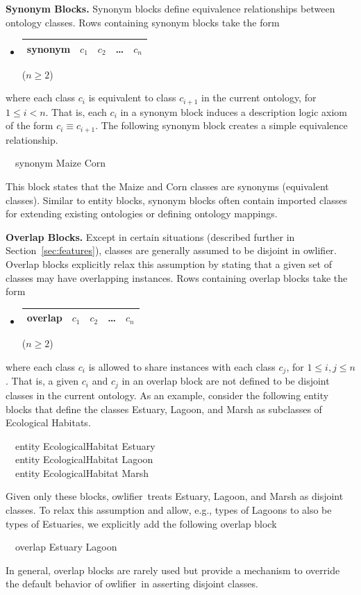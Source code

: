 \documentclass[preprint,number]{elsarticle}
\newcommand{\owlifier}{\textsf{owlifier}}
\newcommand{\myblock}[1]{\vspace{12pt}\noindent\textbf{#1}}
\newcommand{\secref}[1]{Section~\ref{#1}}
\begin{document}
\myblock{Synonym Blocks.} Synonym blocks define equivalence
relationships between ontology classes.  Rows containing synonym
blocks take the form
\begin{itemize}
\item[] 
  \begin{tabular}{|l|l|l|l|l|}\hline
    \textsf{synonym} & $c_1$ & $c_2$ & \dots & $c_n$ \\ \hline 
  \end{tabular} \hfill ($n \ge 2$)
\end{itemize}
where each class $c_i$ is equivalent to class $c_{i+1}$ in the current
ontology, for $1 \le i < n$. That is, each $c_i$ in a synonym block
induces a description logic axiom of the form $c_i \equiv
c_{i+1}$. The following synonym block creates a simple equivalence
relationship.
\begin{tabbing}
  ~~\textsf{synonym} \textsf{Maize} \textsf{Corn}
\end{tabbing}
This block states that the Maize and Corn classes are synonyms
(equivalent classes). Similar to entity blocks, synonym blocks often
contain imported classes for extending existing ontologies or defining
ontology mappings.


\myblock{Overlap Blocks.} Except in certain situations (described
further in \secref{sec:features}), classes are generally
assumed to be disjoint in \owlifier.  Overlap blocks explicitly relax
this assumption by stating that a given set of classes may have
overlapping instances. Rows containing overlap blocks take the form
\begin{itemize}
\item[] 
  \begin{tabular}{|l|l|l|l|l|}\hline
    \textsf{overlap} & $c_1$ & $c_2$ & \dots & $c_n$ \\ \hline 
  \end{tabular} \hfill ($n \ge 2$)
\end{itemize}
where each class $c_i$ is allowed to share instances with each class
$c_j$, for $1 \le i,j \le n$. That is, a given $c_i$ and $c_j$ in an
overlap block are not defined to be disjoint classes in the current
ontology. As an example, consider the following entity blocks that
define the classes Estuary, Lagoon, and Marsh as subclasses of
Ecological Habitats.
\begin{tabbing}
  ~~\textsf{entity} \textsf{EcologicalHabitat} \textsf{Estuary} \\ 
  ~~\textsf{entity} \textsf{EcologicalHabitat} \textsf{Lagoon} \\ 
  ~~\textsf{entity} \textsf{EcologicalHabitat} \textsf{Marsh} 
\end{tabbing}
Given only these blocks, \owlifier\ treats Estuary, Lagoon, and Marsh
as disjoint classes. To relax this assumption and allow, e.g., types
of Lagoons to also be types of Estuaries, we explicitly add the
following overlap block
\begin{tabbing}
  ~~\textsf{overlap} \textsf{Estuary} \textsf{Lagoon}
\end{tabbing}
In general, overlap blocks are rarely used but provide a mechanism to
override the default behavior of \owlifier\ in asserting disjoint
classes.
\end{document}
